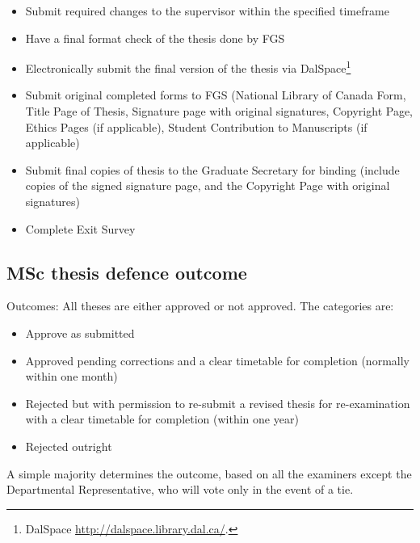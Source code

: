 \documentclass{article}
\newcommand\elink[1]{\url{#1}}
\begin{document}
\begin{itemize}
\begin{itemize}
            \item Submit required changes to the supervisor within the
                specified timeframe

            \item Have a final format check of the thesis done by FGS

            \item Electronically submit the final version of the thesis via
                DalSpace\footnote{DalSpace
                \elink{http://dalspace.library.dal.ca/}.}

            \item Submit original completed forms to FGS (National Library of
                Canada Form, Title Page of Thesis, Signature page with original
                signatures, Copyright Page, Ethics Pages (if applicable),
                Student Contribution to Manuscripts (if applicable)

            \item Submit final copies of thesis to the Graduate Secretary for
                binding (include copies of the signed signature page, and the
                Copyright Page with original signatures)

            \item Complete Exit Survey

        \end{itemize}

\end{itemize}

\subsection{MSc thesis defence outcome}

Outcomes: All theses are either approved or not approved. The categories are:
\begin{itemize}
\item Approve as submitted
\item Approved pending corrections and a clear timetable for completion (normally within one month)
\item Rejected but with permission to re-submit a revised thesis for re-examination with a clear timetable for completion (within one year)
\item Rejected outright
\end{itemize}

A simple majority determines the outcome, based on all the examiners except the
Departmental Representative, who will vote only in the event of a tie.
\end{document}

